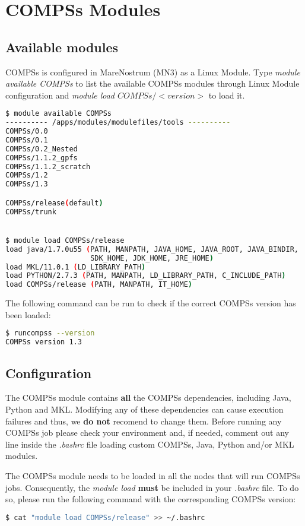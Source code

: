 \section{COMPSs Modules}
\label{sec:Modules}


\subsection{Available modules}
COMPSs is configured in MareNostrum (MN3) as a Linux Module. Type \textit{module available COMPSs} to list the available COMPSs modules 
through Linux Module configuration and \textit{module load $COMPSs/<version>$} to load it.
\begin{lstlisting}[language=bash]
$ module available COMPSs
---------- /apps/modules/modulefiles/tools ----------
COMPSs/0.0                          
COMPSs/0.1
COMPSs/0.2_Nested
COMPSs/1.1.2_gpfs
COMPSs/1.1.2_scratch
COMPSs/1.2 
COMPSs/1.3

COMPSs/release(default)
COMPSs/trunk


$ module load COMPSs/release
load java/1.7.0u55 (PATH, MANPATH, JAVA_HOME, JAVA_ROOT, JAVA_BINDIR, 
                    SDK_HOME, JDK_HOME, JRE_HOME)
load MKL/11.0.1 (LD_LIBRARY_PATH)
load PYTHON/2.7.3 (PATH, MANPATH, LD_LIBRARY_PATH, C_INCLUDE_PATH)
load COMPSs/release (PATH, MANPATH, IT_HOME)
\end{lstlisting}

The following command can be run to check if the correct COMPSs version has been loaded:
\begin{lstlisting}[language=bash]
$ runcompss --version
COMPSs version 1.3

\end{lstlisting}

\subsection{Configuration}
The COMPSs module contains \textbf{all} the COMPSs dependencies, including Java, Python and MKL. Modifying any of these dependencies
can cause execution failures and thus, we \textbf{do not} recomend to change them. Before running any COMPSs job please check your 
environment and, if needed, comment out any line inside the \textit{.bashrc} file loading custom COMPSs, Java, Python and/or MKL
modules.

The COMPSs module needs to be loaded in all the nodes that will run COMPSs jobs. Consequently, the \textit{module load} \textbf{must}
be included in your \textit{.bashrc} file. To do so, please run the following command with the corresponding COMPSs version:
\begin{lstlisting}[language=bash]
$ cat "module load COMPSs/release" >> ~/.bashrc
\end{lstlisting}

